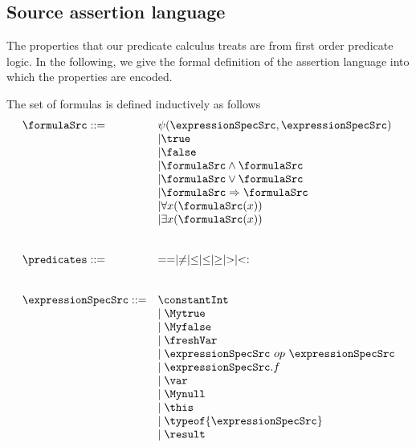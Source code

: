 
\subsection{Source assertion language} \label{formulasSrc}
The properties that our predicate calculus treats are from first order predicate logic.
In the following, we give the formal definition of the assertion language into which 
the properties are encoded.

 

\begin{Formula}[Definition]
The set of formulas is defined inductively as follows
	$$
	\begin{array}{ll}
	\formulaSrc ::= & \psi(\expressionSpecSrc,  \expressionSpecSrc )\\
	  & \vert \true \\
	  & \vert  \false \\	
	  & \vert \formulaSrc \wedge \formulaSrc \\
	  & \vert \formulaSrc \vee  \formulaSrc \\
	  & \vert \formulaSrc \Rightarrow \formulaSrc \\
	  & \vert \forall x  (  \formulaSrc(x) ) \\
	  & \vert \exists x  ( \formulaSrc (x))	 \\
      
          & \\
	  & \\
	  \predicates ::=  &   == \mid \neq \mid \leq \mid \le \mid \geq \mid > \mid  <: \\
	  & \\
	  & \\
	  \expressionSpecSrc  ::= & \constantInt  \\
	                          & \mid \Mytrue \\ 
	                          & \mid \Myfalse \\
	                          & \mid \freshVar \\
				  & \mid \expressionSpecSrc \ op \ \expressionSpecSrc \\  
				  & \mid \expressionSpecSrc.f \\
				  & \mid \var \\
  			          & \mid \Mynull  \\
				  & \mid \this \\
	                          & \mid \typeof{\expressionSpecSrc} \\
	                          & \mid \result
                                  
	\end{array}
	$$ 
\end{Formula}


